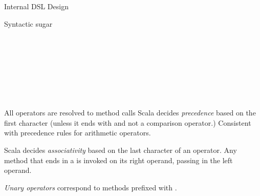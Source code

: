 \documentclass[serif,t,11pt]{beamer}
\begin{document}
\begin{frame}{Internal DSL Design}

\begin{exampleblock}{Syntactic sugar}
\begin{columns}
\begin{column}[l]{5cm}
\\
\\
\\
\\
\\
\end{column}
\begin{column}[r]{5cm}
\\
\\
\\
\\
\\
\end{column}
\end{columns}
\end{exampleblock}

\pause

\begin{alertblock}{All operators are resolved to method calls}
Scala decides \emph{precedence} based on the first character (unless it ends with \code{=} and not a comparison operator.)
Consistent with precedence rules for arithmetic operators.

Scala decides \emph{associativity} based on the last character of an operator. Any method that ends in a \code{:} is invoked on its right operand, passing in the left operand. 

\emph{Unary operators} correspond to methods prefixed with .
\end{alertblock}
\end{frame}
\end{document}
